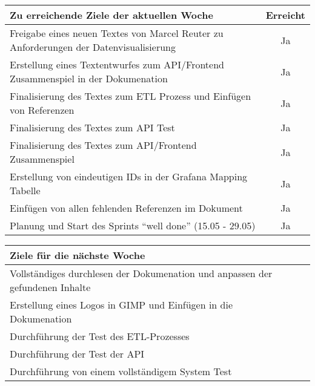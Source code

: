 \begin{tabularx}{\textwidth}{Xc}
    \arrayrulecolor{OliveGreen}
    \toprule
    {\bfseries Zu erreichende Ziele der aktuellen Woche} & {\bfseries Erreicht} \\
    \midrule[2pt]
    Freigabe eines neuen Textes von Marcel Reuter zu Anforderungen der 
    Datenvisualisierung &Ja \\
    \rowcolor{OliveGreen!15}
    Erstellung eines Textentwurfes zum API/Frontend Zusammenspiel in der
    Dokumenation &Ja \\
    \rowcolor{White}
    Finalisierung des Textes zum ETL Prozess und Einfügen von Referenzen &Ja \\
    \rowcolor{OliveGreen!15}
    Finalisierung des Textes zum API Test &Ja \\
    \rowcolor{White}
    Finalisierung des Textes zum API/Frontend Zusammenspiel &Ja \\
    \rowcolor{OliveGreen!15}
    Erstellung von eindeutigen IDs in der Grafana Mapping Tabelle &Ja \\
    \rowcolor{White}
    Einfügen von allen fehlenden Referenzen im Dokument &Ja \\
    \rowcolor{OliveGreen!15}
    Planung und Start des Sprints ``well done'' (15.05 - 29.05) &Ja \\
    \bottomrule[2pt]
\end{tabularx}
%
\vspace{1cm}
%
\begin{tabularx}{\textwidth}{Xc}
    \arrayrulecolor{OliveGreen}
    \toprule
    {\bfseries Ziele für die nächste Woche}              &                   \\
    \midrule[2pt]
    Vollständiges durchlesen der Dokumenation und anpassen der gefundenen
    Inhalte & \\
    \rowcolor{OliveGreen!15}
    Erstellung eines Logos in GIMP und Einfügen in die Dokumenation & \\
    \rowcolor{White}
    Durchführung der Test des ETL-Prozesses & \\
    \rowcolor{White}
    Durchführung der Test der API & \\
    \rowcolor{White}
    Durchführung von einem vollständigem System Test & \\
\end{tabularx}
